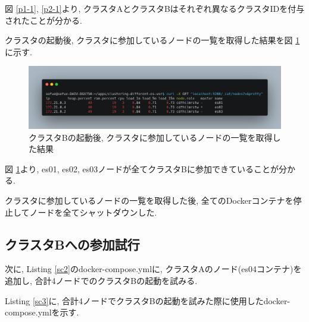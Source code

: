 \documentclass[a4j,12pt,]{jarticle}
\begin{document}
図 \ref{p1-1}, \ref{p2-1}より, クラスタAとクラスタBはそれぞれ異なるクラスタIDを付与されたことが分かる.

クラスタの起動後, クラスタに参加しているノードの一覧を取得した結果を図 \ref{p2-2}に示す.

\begin{figure}[H]
  \begin{center}
    \includegraphics[width=160mm]{3nodes-list.png}
    \caption{クラスタBの起動後, クラスタに参加しているノードの一覧を取得した結果}
    \label{p2-2}
  \end{center}
\end{figure}

図 \ref{p2-2}より, es01, es02, es03ノードが全てクラスタBに参加できていることが分かる.

クラスタに参加しているノードの一覧を取得した後, 全てのDockerコンテナを停止してノードを全てシャットダウンした.

\subsection{クラスタBへの参加試行}

次に, Listing \ref{sc2}のdocker-compose.ymlに, クラスタAのノード(es04コンテナ)を追加し, 合計4ノードでのクラスタBの起動を試みる.

Listing \ref{sc3}に, 合計4ノードでクラスタBの起動を試みた際に使用したdocker-compose.ymlを示す.


\end{document}
